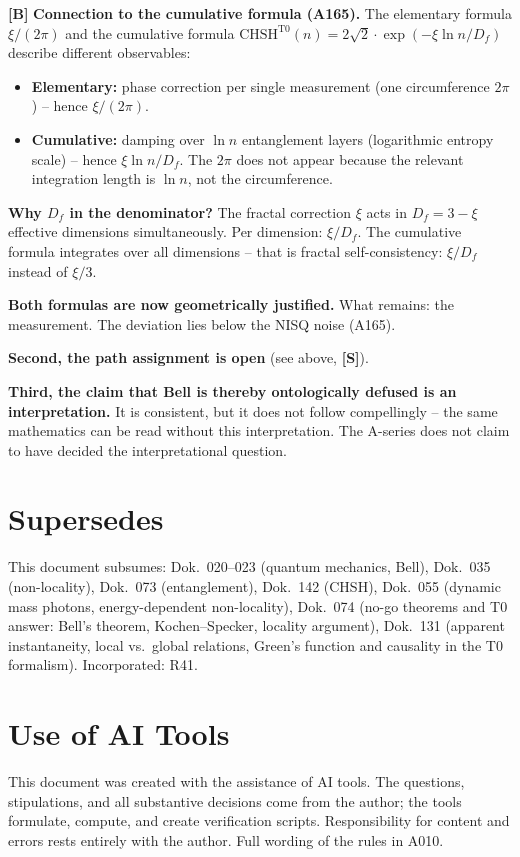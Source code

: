 \textbf{[B]} \textbf{Connection to the cumulative formula (A165).}
The elementary formula $\xi/(2\pi)$ and the cumulative formula
$\text{CHSH}^{\text{T0}}(n)=2\sqrt2\cdot\exp(-\xi\ln n/D_f)$
describe different observables:
\begin{itemize}[leftmargin=2em,itemsep=1pt,topsep=2pt]
  \item \textbf{Elementary:} phase correction per single measurement (one
    circumference $2\pi$) -- hence $\xi/(2\pi)$.
  \item \textbf{Cumulative:} damping over $\ln n$ entanglement layers (logarithmic
    entropy scale) -- hence $\xi\ln n/D_f$. The $2\pi$ does not appear because
    the relevant integration length is $\ln n$, not the circumference.
\end{itemize}
\textbf{Why $D_f$ in the denominator?} The fractal correction $\xi$ acts in
$D_f=3-\xi$ effective dimensions simultaneously. Per dimension: $\xi/D_f$.
The cumulative formula integrates over all dimensions -- that is fractal
self-consistency: $\xi/D_f$ instead of $\xi/3$.

\textbf{Both formulas are now geometrically justified.} What remains: the
measurement. The deviation lies below the NISQ noise (A165).

\textbf{Second, the path assignment is open} (see above, \textbf{[S]}).

\textbf{Third, the claim that Bell is thereby ontologically defused is an
interpretation.} It is consistent, but it does not follow compellingly -- the
same mathematics can be read without this interpretation. The A-series does not
claim to have decided the interpretational question.

\section{Supersedes}

This document subsumes: Dok.~020--023 (quantum mechanics, Bell), Dok.~035
(non-locality), Dok.~073 (entanglement), Dok.~142 (CHSH), Dok.~055 (dynamic
mass photons, energy-dependent non-locality), Dok.~074 (no-go theorems and T0
answer: Bell's theorem, Kochen--Specker, locality argument), Dok.~131 (apparent
instantaneity, local vs.\ global relations, Green's function and causality in the
T0 formalism). Incorporated: R41.

\section{Use of AI Tools}

This document was created with the assistance of AI tools. The questions,
stipulations, and all substantive decisions come from the author; the tools
formulate, compute, and create verification scripts.
Responsibility for content and errors rests entirely with the author.
Full wording of the rules in A010.

